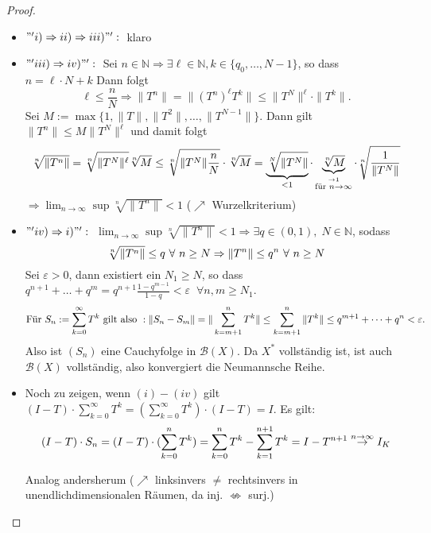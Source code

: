 \documentclass[ngerman]{report}
\theoremstyle{plain}%
\theoremstyle{definition}%
\theoremstyle{myStyle}
\newcommand{\N}{\mathbb{N}}
\newcommand{\B}{\mathcal{B}} %
\newcommand{\norm}[1]{\|#1\|}
\newcommand{\df}[1][]{%
	\overset{#1}{\Rightarrow}
}
\newcommand{\limes}[1][\infty]{\lim_{n \to #1}}
\newcommand{\disp}{\displaystyle}
\newcommand{\qmarks}[1]{#1}
\newcommand{\spcm}[1][-0.8]{\vspace{#1 em}}
\begin{document}
		\begin{proof}
			\begin{itemize}[]
				\item $ "' i)\df ii) \df iii)"':\;$ \qmarks{klaro}

				\item $"' iii) \df iv)"':\;$ Sei $n\in\N \df \exists \ell\in\N, k\in \{q_0,\dots,N-1\}$, 
					so dass $n = \ell \cdot N + k$ Dann folgt  
					$$\ell \leq \frac{n}{N} \df \norm{T^n} = \norm{(T^n)^\ell T^k} \leq \norm{T^N}^\ell \cdot \norm{T^k}. $$
					Sei $M := \max\{1,\norm{T},\norm{T^2},\dots,\norm{T^{N-1}}\}$.
					Dann gilt $\norm{T^n} \leq M\norm{T^N}^\ell$ und damit folgt
					\spcm[-0.75] $$ \sqrt[n]{\norm{T^n}} = \sqrt[n]{\norm{T^N}^\ell}\sqrt[n]{M}
					\leq \sqrt[n]{\norm{T^N} \frac{n}{N}} \cdot \sqrt[n]{M}
					 = \underbrace{\sqrt[N]{\norm{T^N}}}_{< 1} \cdot 
						\underbrace{\sqrt[n]{M}}_{\overset{\to 1}{\text{für } n\to\infty}} 
						\cdot \sqrt[n]{\frac{1}{\norm{T^N}}}\spcm[-1]$$
					$\disp \df \limes \sup \sqrt[n]{\norm{T^n}} < 1$   ($\nearrow$ Wurzelkriterium)

				\item $ "'iv) \df i)"': \;$ 
					$\disp \limes \sup \sqrt[n]{\norm{T^n}} < 1 \df \exists q \in (0,1), \; N \in \N$, sodass \spcm
					$$ \sqrt[n]{\norm{T^n}} \leq q ~\forall~ n \geq N \df \norm{T^n} \leq q^n ~\forall~ n \geq N \spcm[-0.6]$$	
					Sei $\varepsilon > 0$, dann existiert ein $N_1 \geq N$, so dass $q^{n+1} + \dots + q^m = q^{n+1} \frac{1-q^{m-1}}{1-q}< \varepsilon \;\; \forall n,m \geq N_1$.
					\spcm
					$$ \text{Für } S_n:=\sum_{k=0}^\infty T^k \text{ gilt also }:
					\norm{S_n-S_m}=\norm{\sum_{k=m+1}^n T^k}\leq \sum_{k=m+1}^n \norm{T^k} \leq q^{m+1}+\dots+q^n < \varepsilon. \spcm[-0.5]
					$$	
					Also ist $(S_n)$ eine Cauchyfolge in $\B(X)$. Da $X^{*}$ vollständig ist, ist auch $\B(X)$ vollständig, also konvergiert die Neumannsche Reihe.

			
			\item 
			Noch zu zeigen, wenn $(i) - (iv)$ gilt
				$(I - T) \cdot \sum_{k=0}^\infty T^k = (\sum_{k=0}^\infty T^k) \cdot (I-T) = I$.
			Es gilt: 
			\spcm[-0.4]
			$$(I-T) \cdot S_n = (I-T) \cdot (\sum_{k=0}^n T^k) = \sum_{k=0}^n T^k - \sum_{k=1}^{n+1} T^k = I-T^{n+1} \overset{n \to \infty}{\to} I_K \spcm[-0.4] $$
			
			Analog andersherum ($\nearrow$ linksinvers $ \neq $ rechtsinvers in unendlichdimensionalen Räumen, da inj. $\not\Leftrightarrow$ surj.)
			\end{itemize}
		\end{proof}
\end{document}
